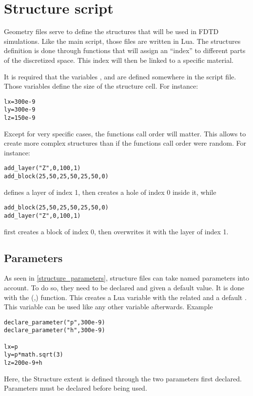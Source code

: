 \section{Structure script}

Geometry files serve to define the structures that will be used in FDTD simulations. Like the main script, those files are written in Lua. The structures definition is done through functions that will assign an ``index'' to different parts of the discretized space. This index will then be linked to a specific material.
	
	It is required that the variables ,  and  are defined somewhere in the script file. Those variables define the size of the structure cell. For instance:

\begin{lstlisting}
lx=300e-9
ly=300e-9
lz=150e-9
\end{lstlisting}


Except for very specific cases, the functions call order will matter. This allows to create more complex structures than if the functions call order were random. For instance:
\begin{lstlisting}
add_layer("Z",0,100,1)
add_block(25,50,25,50,25,50,0)
\end{lstlisting}
defines a layer of index 1, then creates a hole of index 0 inside it, while
\begin{lstlisting}
add_block(25,50,25,50,25,50,0)
add_layer("Z",0,100,1)
\end{lstlisting}
first creates a block of index 0, then overwrites it with the layer of index 1.

\subsection{Parameters}

As seen in \ref{structure_parameters}, structure files can take named parameters into account. To do so, they need to be declared and given a default value. It is done with the (,) function. This creates a Lua variable with the related  and a default . This variable can be used like any other variable afterwards. Example
\begin{lstlisting}
declare_parameter("p",300e-9)
declare_parameter("h",300e-9)

lx=p
ly=p*math.sqrt(3)
lz=200e-9+h
\end{lstlisting}
Here, the Structure extent is defined through the two parameters first declared. Parameters must be declared before being used.

